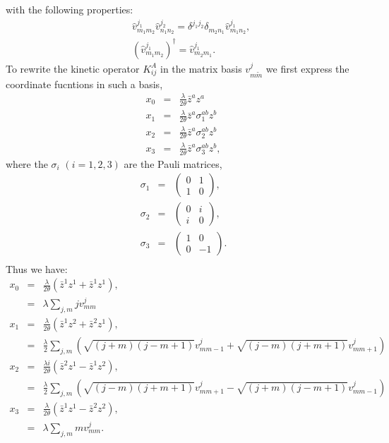 \documentclass[a4paper,11pt]{article} %
\numberwithin{equation}{section} %
\numberwithin{figure}{section} %
\theoremstyle{plain} %
\theoremstyle{definition} %
\theoremstyle{remark} %
\begin{document}
with the following properties:
\begin{eqnarray*}
 && \hat{v}^{j_1}_{m_1 m_2 } \hat{v}^{j_2}_{ n_1 n_2 } = \delta^{j_1 j_2} \delta_{m_2 n_1} \hat{v}^{j_1}_{m_1 n_2 }, \\
 && ( \hat{v}^{j_1}_{m_1 m_2 } )^{\dagger} = \hat{v}^{j_1}_{ m_2 m_1 } .
\end{eqnarray*}
To rewrite the kinetic operator $K^{A}_{ij}$ in the matrix basis ${ v^{j}_{m \tilde{m}} }$ we first express the coordinate fucntions in such a basis,
\begin{eqnarray*}
 x_{0} &=& \frac{\lambda}{2 \theta} \bar{z}^a z^a \\
 x_{1} &=& \frac{\lambda}{2 \theta} \bar{z}^a \sigma_{1}^{ab} z^{b} \\
 x_{2} &=& \frac{\lambda}{2 \theta} \bar{z}^a \sigma_{2}^{ab} z^{b} \\
 x_{3} &=& \frac{\lambda}{2 \theta} \bar{z}^a \sigma_{3}^{ab} z^{b},
\end{eqnarray*}
where the $\sigma_i$ $(i=1,2,3)$ are the Pauli matrices,
\begin{eqnarray*}
 \sigma_{1} &=& 
  \begin{pmatrix}
    0 & 1 \\
    1 & 0 
   \end{pmatrix}, \\
 \sigma_{2} &=& 
  \begin{pmatrix}
    0 & i \\
    i & 0 
   \end{pmatrix}, \\
 \sigma_{3} &=& 
  \begin{pmatrix}
    1 & 0 \\
    0 & -1 
   \end{pmatrix}. \\   
\end{eqnarray*}
Thus we have:
\begin{eqnarray*}
 x_{0} &=& \frac{\lambda}{2 \theta} ( \bar{z}^1 z^1 + \bar{z}^1 z^1 ), \\
       &=& \lambda \sum_{j,m} j v^{j}_{m m} \\
 x_{1} &=& \frac{\lambda}{2 \theta} ( \bar{z}^1 z^2 + \bar{z}^2 z^1 ), \\
       &=& \frac{\lambda}{2} \sum_{j,m} \left( \sqrt{(j+m)(j-m+1)} v^{j}_{m m-1} + \sqrt{(j-m)(j+m+1)} v^{j}_{m m+1} \right) \\
 x_{2} &=& \frac{\lambda i}{2 \theta} ( \bar{z}^2 z^1 - \bar{z}^1 z^2 ), \\
       &=& \frac{\lambda}{2} \sum_{j,m} \left( \sqrt{(j-m)(j+m+1)} v^{j}_{m m+1} - \sqrt{(j+m)(j-m+1)} v^{j}_{m m-1} \right) \\ 
 x_{3} &=& \frac{\lambda}{2 \theta} ( \bar{z}^1 z^1 - \bar{z}^2 z^2 ), \\
       &=& \lambda \sum_{j,m} m v^{j}_{mm} . \\
 \end{eqnarray*}
\end{document}
